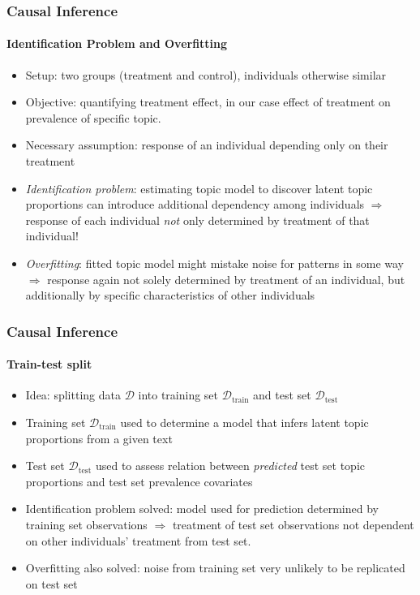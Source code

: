 \documentclass[xcolor=dvipsnames]{beamer}
\begin{document}
\begin{frame}
\frametitle{Causal Inference}
\framesubtitle{Identification Problem and Overfitting}
\begin{itemize}
\item Setup: two groups (treatment and control), individuals otherwise similar
\item Objective: quantifying treatment effect, in our case effect of treatment on prevalence of specific topic.
\item Necessary assumption: response of an individual depending only on their treatment
\item \textit{Identification problem}: estimating topic model to discover latent topic proportions can introduce additional dependency among individuals $\Rightarrow$ response of each individual \textit{not} only determined by treatment of that individual!
\item \textit{Overfitting}: fitted topic model might mistake noise for patterns in some way $\Rightarrow$ response again not solely determined by treatment of an individual, but additionally by specific characteristics of other individuals
\end{itemize}
\end{frame}


\begin{frame}
\frametitle{Causal Inference}
\framesubtitle{Train-test split}
\begin{itemize}
\item Idea: splitting data $\mathcal{D}$ into training set $\mathcal{D}_{\text{train}}$ and test set $\mathcal{D}_{\text{test}}$
\item Training set $\mathcal{D}_{\text{train}}$ used to determine a model that infers latent topic proportions from a given text 
\item Test set $\mathcal{D}_{\text{test}}$ used to assess relation between \textit{predicted} test set topic proportions and test set prevalence covariates
\item Identification problem solved: model used for prediction determined by training set observations $\Rightarrow$ treatment of test set observations not dependent on other individuals' treatment from test set. 
\item Overfitting also solved: noise from training set very unlikely to be replicated on test set
\end{itemize}
\end{frame}
\end{document}
